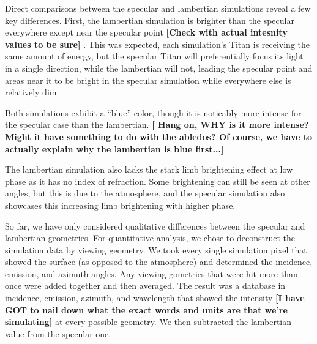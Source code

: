 \documentclass{article}
\begin{document}
Direct comparisons between the specular and lambertian simulations reveal a few key differences. First, the lambertian simulation is brighter than the specular everywhere except near the specular point \textbf{\color{red} [Check with actual intesnity values to be sure] \color{black}}. This was expected, each simulation's Titan is receiving the same amount of energy, but the specular Titan will preferentially focus its light in a single direction, while the lambertian will not, leading the specular point and areas near it to be bright in the specular simulation while everywhere else is relatively dim. 

Both simulations exhibit a ``blue'' color, though it is noticably more intense for the specular case than the lambertian. \textbf{\color{red}[ Hang on, WHY is it more intense? Might it have something to do with the abledos? Of course, we have to actually explain why the lambertian is blue first...]\color{black}}

The lambertian simulation also lacks the stark limb brightening effect at low phase as it has no index of refraction. Some brightening can still be seen at other angles, but this is due to the atmosphere, and the specular simulation also showcases this increasing limb brightening with higher phase.

So far, we have only considered qualitative differences between the specular and lambertian geometries. For quantitative analysis, we chose to deconstruct the simulation data by viewing geometry. We took every single simulation pixel that showed the surface (as opposed to the atmosphere) and determined the incidence, emission, and azimuth angles. Any viewing gometries that were hit more than once were added together and then averaged. The result was a database in incidence, emission, azimuth, and wavelength that showed the intensity \textbf{\color{red}[I have GOT to nail down what the exact words and units are that we're simulating]\color{black}} at every possible geometry. We then subtracted the lambertian value from the specular one.
\end{document}
